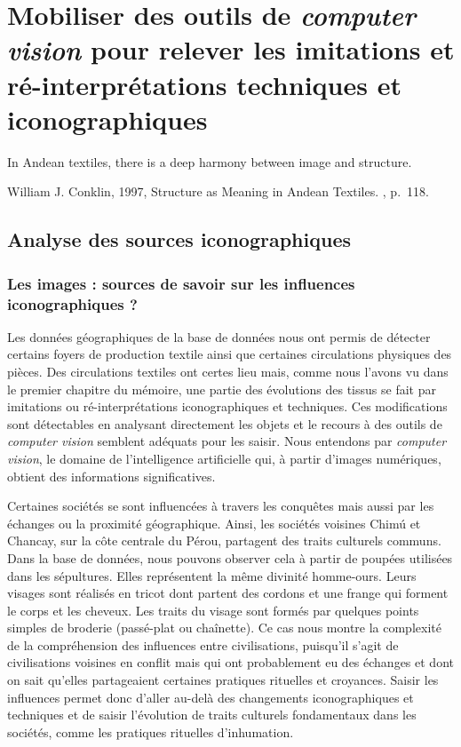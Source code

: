 \chapter{Mobiliser des outils de \textit{computer vision} pour relever les imitations et ré-interprétations techniques et iconographiques}
\markboth{}{}

\epigraph{\og In Andean textiles, there is a deep harmony between image and structure.\fg}{William J. Conklin, 1997, \og Structure as Meaning in Andean Textiles. \fg, p.~118.}


\section{Analyse des sources iconographiques}
\subsection{Les images : sources de savoir sur les influences iconographiques ?}

Les données géographiques de la base de données nous ont permis de détecter certains foyers de production textile ainsi que certaines circulations physiques des pièces.  Des circulations textiles ont certes lieu mais, comme nous l'avons vu dans le premier chapitre du mémoire, une partie des évolutions des tissus se fait par imitations ou ré-interprétations iconographiques et techniques. Ces modifications sont détectables en analysant directement les objets et le recours à des outils de \textit{computer vision} semblent adéquats pour les saisir. Nous entendons par \textit{computer vision}, le domaine de l'intelligence artificielle qui, à partir d'images numériques, obtient des informations significatives.

Certaines sociétés se sont influencées à travers les conquêtes mais aussi par les échanges ou la proximité géographique. 
Ainsi, les sociétés voisines Chimú et Chancay, sur la côte centrale du Pérou, partagent des traits culturels communs. Dans la base de données, nous pouvons observer cela à partir de poupées utilisées dans les sépultures. Elles représentent la même divinité homme-ours. Leurs visages sont réalisés en tricot dont partent des cordons et une frange qui forment le corps et les cheveux. Les traits du visage sont formés par quelques points simples de broderie (passé-plat ou chaînette). Ce cas nous montre la complexité de la compréhension des influences entre civilisations, puisqu'il s'agit de civilisations voisines en conflit mais qui ont probablement eu des échanges et dont on sait qu'elles partageaient certaines pratiques rituelles et croyances. Saisir les influences permet donc d'aller au-delà des changements iconographiques et techniques et de saisir l'évolution de traits culturels fondamentaux dans les sociétés, comme les pratiques rituelles d'inhumation. 


